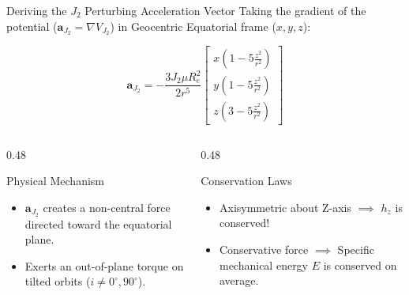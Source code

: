\documentclass[aspectratio=169,11pt]{beamer}
\begin{document}
\begin{frame}{Deriving the $J_2$ Perturbing Acceleration Vector}
    Taking the gradient of the potential ($\mathbf{a}_{J_2} = \nabla V_{J_2}$) in Geocentric Equatorial frame ($x, y, z$):

    \begin{equation*}
        \mathbf{a}_{J_2} = -\frac{3 J_2 \mu R_e^2}{2 r^5} 
        \begin{bmatrix}
            x \left( 1 - 5\frac{z^2}{r^2} \right) \\
            y \left( 1 - 5\frac{z^2}{r^2} \right) \\
            z \left( 3 - 5\frac{z^2}{r^2} \right)
        \end{bmatrix}
    \end{equation*}

    \begin{columns}[T]
        \begin{column}{0.48\textwidth}
            \begin{block}{Physical Mechanism}
                \begin{itemize}
                    \item $\mathbf{a}_{J_2}$ creates a non-central force directed toward the equatorial plane.
                    \item Exerts an out-of-plane torque on tilted orbits ($i \neq 0^\circ, 90^\circ$).
                \end{itemize}
            \end{block}
        \end{column}
        \begin{column}{0.48\textwidth}
            \begin{block}{Conservation Laws}
                \begin{itemize}
                    \item Axisymmetric about Z-axis $\implies$ $h_z$ is conserved!
                    \item Conservative force $\implies$ Specific mechanical energy $E$ is conserved on average.
                \end{itemize}
            \end{block}
        \end{column}
    \end{columns}
\end{frame}
\end{document}
